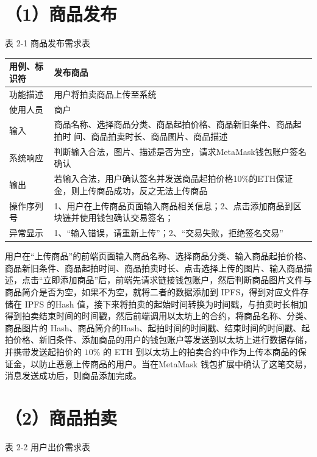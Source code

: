 \documentclass[
  10
]{article}
\newcounter{none} %
\begin{document}
\section{（1）商品发布}\label{ux5546ux54c1ux53d1ux5e03}

表 2-1 商品发布需求表

{\def\LTcaptype{none} %
\begin{longtable}[]{@{}|l|l|@{}}
\toprule\noalign{}
\endhead
\bottomrule\noalign{}
\endlastfoot
\hline
用例、标识符 & 发布商品 \\
\hline
功能描述 & 用户将拍卖商品上传至系统 \\
\hline
使用人员 & 商户 \\
\hline
输入 & 商品名称、选择商品分类、商品起拍价格、商品新旧条件、商品起拍时
间、商品拍卖时长、商品图片、商品描述 \\
\hline
系统响应 &
判断输入合法，图片、描述是否为空，请求MetaMask钱包账户签名确认 \\
\hline
输出 &
若输入合法，用户确认签名并发送商品起拍价格10\%的ETH保证金，则上传商品成功，反之无法上传商品 \\
\hline
操作序列号 &
1、用户在上传商品页面输入商品相关信息；2、点击添加商品到区块链并使用钱包确认交易签名； \\
\hline
异常显示 & 1、``输入错误，请重新上传''；2、``交易失败，拒绝签名交易'' \\
\hline
\end{longtable}
}

用户在``上传商品''的前端页面输入商品名称、选择商品分类、输入商品起拍价格、商品新旧条件、商品起拍时间、商品拍卖时长、点击选择上传的图片、输入商品描述，点击``立即添加商品''后，前端先请求链接钱包账户，然后判断商品图片文件与商品简介是否为空，如果不为空，就将二者的数据添加到
IPFS，得到对应文件存储在 IPFS 的Hash
值，接下来将拍卖的起始时间转换为时间戳，与拍卖时长相加得到拍卖结束时间的时间戳，然后前端调用以太坊上的合约，将商品名称、分类、商品图片的
Hash、商品简介的Hash、起拍时间的时间戳、结束时间的时间戳、起拍价格、新旧条件、添加商品的用户的钱包账户等发送到以太坊上进行数据存储，并携带发送起拍价的
\(10 \%\) 的 ETH
到以太坊上的拍卖合约中作为上传本商品的保证金，以防止恶意上传商品的用户。当在MetaMask
钱包扩展中确认了这笔交易，消息发送成功后，则商品添加完成。

\section{（2）商品拍卖}\label{ux5546ux54c1ux62cdux5356}

表 2-2 用户出价需求表
\end{document}
